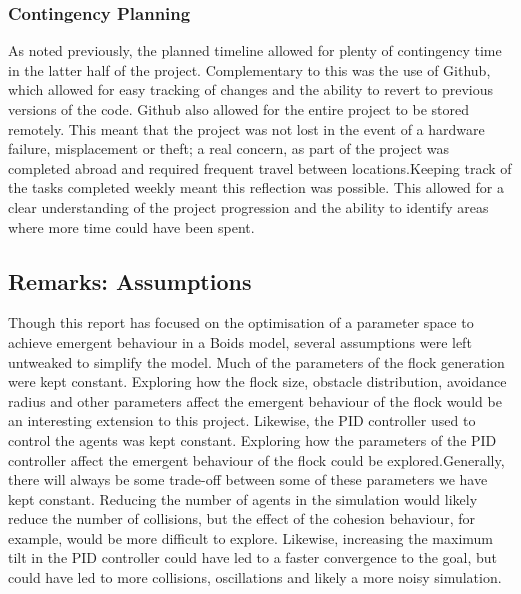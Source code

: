 \documentclass[12pt]{article}
\begin{document}
\subsubsection{Contingency Planning}
As noted previously, the planned timeline allowed for plenty of contingency time in the latter half of the project. Complementary to this was the use of Github, which allowed for easy tracking of changes and the ability to revert to previous versions of the code. Github also allowed for the entire project to be stored remotely. This meant that the project was not lost in the event of a hardware failure, misplacement or theft; a real concern, as part of the project was completed abroad and required frequent travel between locations.Keeping track of the tasks completed weekly meant this reflection was possible. This allowed for a clear understanding of the project progression and the ability to identify areas where more time could have been spent. 

\subsection{Remarks: Assumptions}
Though this report has focused on the optimisation of a parameter space to achieve emergent behaviour in a Boids model, several assumptions were left untweaked to simplify the model. Much of the parameters of the flock generation were kept constant. Exploring how the flock size, obstacle distribution, avoidance radius and other parameters affect the emergent behaviour of the flock would be an interesting extension to this project. Likewise, the PID controller used to control the agents was kept constant. Exploring how the parameters of the PID controller affect the emergent behaviour of the flock could be explored.Generally, there will always be some trade-off between some of these parameters we have kept constant. Reducing the number of agents in the simulation would likely reduce the number of collisions, but the effect of the cohesion behaviour, for example, would be more difficult to explore. Likewise, increasing the maximum tilt in the PID controller could have led to a faster convergence to the goal, but could have led to more collisions, oscillations and likely a more noisy simulation.
\end{document}
